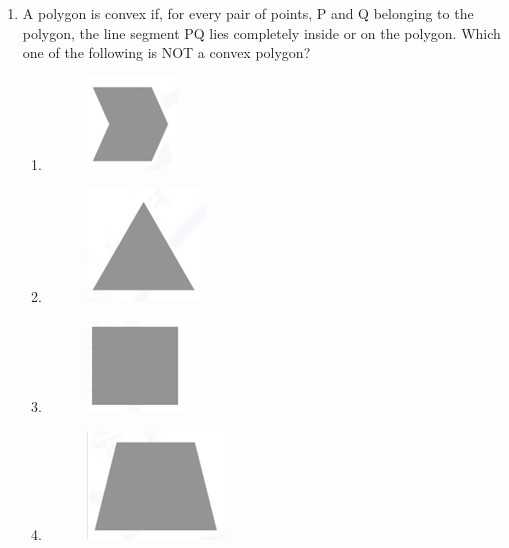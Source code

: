 \documentclass[a4paper, 11pt]{article}
\begin{document}
\begin{enumerate}
    \item A polygon is convex if, for every pair of points, P and Q belonging to the polygon, the line segment PQ lies completely inside or on the polygon.
    Which one of the following is NOT a convex polygon?
    \begin{enumerate}
        \item 
        \begin{figure}[H]
            \centering
            \includegraphics[width=0.1\columnwidth]{figs/q2A.png}
            \label{fig:q2}
        \end{figure}
        \item \begin{figure}[H]
            \centering
            \includegraphics[width=0.1\columnwidth]{figs/q2B.png}
            \label{fig:placeholder}
        \end{figure}
        \item \begin{figure}[H]
            \centering
            \includegraphics[width=0.1\columnwidth]{figs/q2C.png}
            \label{fig:placeholder}
        \end{figure}
        \item \begin{figure}[H]
            \centering
            \includegraphics[width=0.1\columnwidth]{figs/q2D.png}
            \label{fig:placeholder}
        \end{figure}
    \end{enumerate}
    \hfill{}


\end{enumerate}
\end{document}
